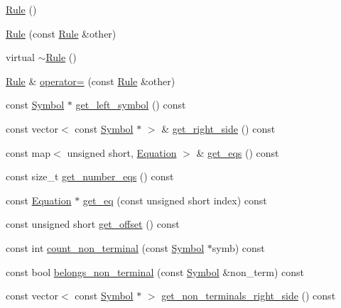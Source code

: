 \begin{DoxyCompactItemize}
\item 
\hyperlink{classgenevalmag_1_1Rule_a1c442e245962ae690729738c7b520c1e}{Rule} ()
\item 
\hyperlink{classgenevalmag_1_1Rule_afcf6ef1d44e45aef162eff2e42f6d68e}{Rule} (const \hyperlink{classgenevalmag_1_1Rule}{Rule} \&other)
\item 
virtual \hyperlink{classgenevalmag_1_1Rule_a70a5808ffd4cbce7f8cb3daf4ed1aa71}{$\sim$Rule} ()
\item 
\hyperlink{classgenevalmag_1_1Rule}{Rule} \& \hyperlink{classgenevalmag_1_1Rule_ae274bef9bade4c17cefc5fbf0cfef8ec}{operator=} (const \hyperlink{classgenevalmag_1_1Rule}{Rule} \&other)
\item 
const \hyperlink{classgenevalmag_1_1Symbol}{Symbol} $\ast$ \hyperlink{classgenevalmag_1_1Rule_a4d67205ef292350a440a10f7bbdda0e1}{get\_\-left\_\-symbol} () const 
\item 
const vector$<$ const \hyperlink{classgenevalmag_1_1Symbol}{Symbol} $\ast$ $>$ \& \hyperlink{classgenevalmag_1_1Rule_a2dcb9b7560f962cb6ece6364e209003b}{get\_\-right\_\-side} () const 
\item 
const map$<$ unsigned short, \hyperlink{classgenevalmag_1_1Equation}{Equation} $>$ \& \hyperlink{classgenevalmag_1_1Rule_aa91f94ae6289b840dc17414c59a844a4}{get\_\-eqs} () const 
\item 
const size\_\-t \hyperlink{classgenevalmag_1_1Rule_a702d3fa2d88408087e57b2fd58706ca7}{get\_\-number\_\-eqs} () const 
\item 
const \hyperlink{classgenevalmag_1_1Equation}{Equation} $\ast$ \hyperlink{classgenevalmag_1_1Rule_af7912b2d239ede0e33ed6cb12b2d79ee}{get\_\-eq} (const unsigned short index) const 
\item 
const unsigned short \hyperlink{classgenevalmag_1_1Rule_ae0c8764f699b6c41f46a9a0c6e010e6c}{get\_\-offset} () const 
\item 
const int \hyperlink{classgenevalmag_1_1Rule_a39eaafed8e0b506686d83175329c1085}{count\_\-non\_\-terminal} (const \hyperlink{classgenevalmag_1_1Symbol}{Symbol} $\ast$symb) const 
\item 
const bool \hyperlink{classgenevalmag_1_1Rule_a587e49507f553c99c79c82aabe6c470f}{belongs\_\-non\_\-terminal} (const \hyperlink{classgenevalmag_1_1Symbol}{Symbol} \&non\_\-term) const 
\item 
const vector$<$ const \hyperlink{classgenevalmag_1_1Symbol}{Symbol} $\ast$ $>$ \hyperlink{classgenevalmag_1_1Rule_a639ed428a76f9c389bad3fc7730aaef6}{get\_\-non\_\-terminals\_\-right\_\-side} () const 

\end{DoxyCompactItemize}
